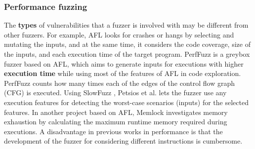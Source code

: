 \subsubsection{Performance fuzzing}

The \textbf{types} of vulnerabilities that a fuzzer is involved with may be different from other fuzzers. For example, AFL looks for crashes or hangs by selecting and mutating the inputs, and at the same time, it considers the code coverage, size of the inputs, and each execution time of the target program. PerfFuzz \cite{lemieux2018perffuzz} is a greybox fuzzer based on AFL, which aims to generate inputs for executions with higher \textbf{execution time} while using most of the features of AFL in code exploration. PerfFuzz counts how many times each of the edges of the control flow graph (CFG) is executed. Using SlowFuzz \cite{petsios2017slowfuzz}, Petsios et al. lets the fuzzer use any execution features for detecting the worst-case scenarios (inputs) for the selected features. In another project based on AFL, Memlock \cite{wen2020memlock} investigates memory exhaustion by calculating the maximum runtime memory required during executions. A disadvantage in previous works in performance is that the development of the fuzzer for considering different instructions is cumbersome.

\vspace{1.5\baselineskip}
